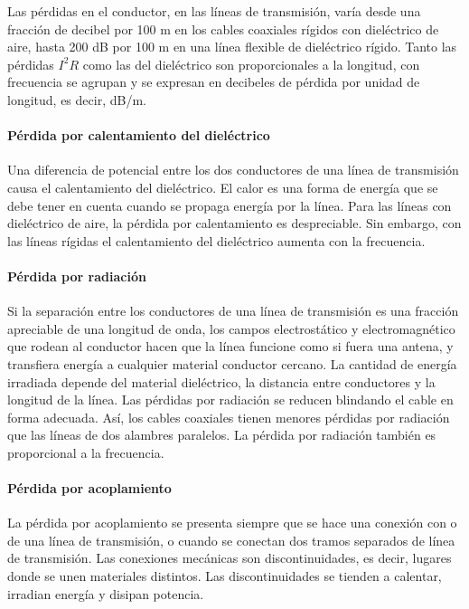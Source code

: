                 Las pérdidas en el conductor, en las líneas de transmisión, varía desde una fracción de decibel por 100 m en los cables coaxiales rígidos con dieléctrico de aire, hasta 200 dB por 100 m en una línea flexible de dieléctrico rígido. Tanto las pérdidas $I^2R$ como las del dieléctrico son proporcionales a la longitud, con frecuencia se agrupan y se expresan en decibeles de pérdida por unidad de longitud, es decir, dB/m.

            \paragraph{Pérdida por calentamiento del dieléctrico}

                Una diferencia de potencial entre los dos conductores de una línea de transmisión causa el calentamiento del dieléctrico. El calor es una forma de energía que se debe tener en cuenta cuando se propaga energía por la línea. Para las líneas con dieléctrico de aire, la pérdida por calentamiento es despreciable. Sin embargo, con las líneas rígidas el calentamiento del dieléctrico aumenta con la frecuencia.

            \paragraph{Pérdida por radiación}

                Si la separación entre los conductores de una línea de transmisión es una fracción apreciable de una longitud de onda, los campos electrostático y electromagnético que rodean al conductor hacen que la línea funcione como si fuera una antena, y transfiera energía a cualquier material conductor cercano. La cantidad de energía irradiada depende del material dieléctrico, la distancia entre conductores y la longitud de la línea. Las pérdidas por radiación se reducen blindando el cable en forma adecuada. Así, los cables coaxiales tienen menores pérdidas por radiación que las líneas de dos alambres paralelos. La pérdida por radiación también es proporcional a la frecuencia.

            \paragraph{Pérdida por acoplamiento}

                La pérdida por acoplamiento se presenta siempre que se hace una conexión con o de una línea de transmisión, o cuando se conectan dos tramos separados de línea de transmisión. Las conexiones mecánicas son discontinuidades, es decir, lugares donde se unen materiales distintos. Las discontinuidades se tienden a calentar, irradian energía y disipan potencia.

